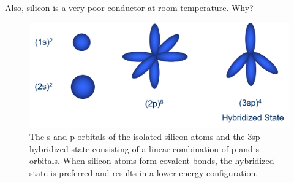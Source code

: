 Also, silicon is a very poor conductor at room temperature. Why?
\begin{figure}
\centering
\includegraphics[width=.75\columnwidth]{slide20}
\caption{The s and p orbitals of the isolated silicon atoms and the 3sp hybridized state consisting of a linear combination of p and s orbitals.  When silicon atoms form covalent bonds, the hybridized state is preferred and results in a lower energy configuration.}
\label{fig:slide20}
\end{figure}
